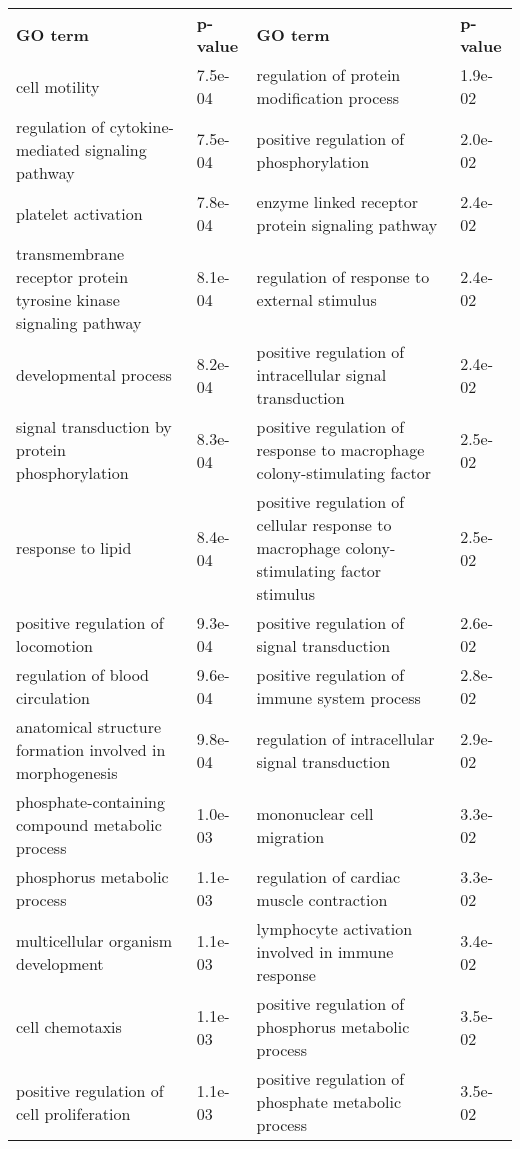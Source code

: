 \documentclass[fleqn,10pt]{SelfArx} %
\begin{document}
\begin{table}[!htb]
	\centering
	\scriptsize
	\begin{tabularx}{\textwidth}{XlXl}
		\rowcolor{NavyBlue!80}
		\textbf{\color{white} GO term} & \textbf{\color{white} p-value} & \textbf{\color{white} GO term} & \textbf{\color{white} p-value} \\
		cell motility & 7.5e-04 & regulation of protein modification process & 1.9e-02 \\ 
		regulation of cytokine-mediated signaling pathway & 7.5e-04 & positive regulation of phosphorylation & 2.0e-02 \\ 
		platelet activation & 7.8e-04 & enzyme linked receptor protein signaling pathway & 2.4e-02 \\ 
		transmembrane receptor protein tyrosine kinase signaling pathway & 8.1e-04 & regulation of response to external stimulus & 2.4e-02 \\ 
		developmental process & 8.2e-04 & positive regulation of intracellular signal transduction & 2.4e-02 \\ 
		signal transduction by protein phosphorylation & 8.3e-04 & positive regulation of response to macrophage colony-stimulating factor & 2.5e-02 \\ 
		response to lipid & 8.4e-04 & positive regulation of cellular response to macrophage colony-stimulating factor stimulus & 2.5e-02 \\ 
		positive regulation of locomotion & 9.3e-04 & positive regulation of signal transduction & 2.6e-02 \\ 
		regulation of blood circulation & 9.6e-04 & positive regulation of immune system process & 2.8e-02 \\ 
		anatomical structure formation involved in morphogenesis & 9.8e-04 & regulation of intracellular signal transduction & 2.9e-02 \\ 
		phosphate-containing compound metabolic process & 1.0e-03 & mononuclear cell migration & 3.3e-02 \\ 
		phosphorus metabolic process & 1.1e-03 & regulation of cardiac muscle contraction & 3.3e-02 \\ 
		multicellular organism development & 1.1e-03 & lymphocyte activation involved in immune response & 3.4e-02 \\ 
		cell chemotaxis & 1.1e-03 & positive regulation of phosphorus metabolic process & 3.5e-02 \\ 
		positive regulation of cell proliferation & 1.1e-03 & positive regulation of phosphate metabolic process & 3.5e-02 \\ 

\end{tabularx}
\end{table}
\end{document}
